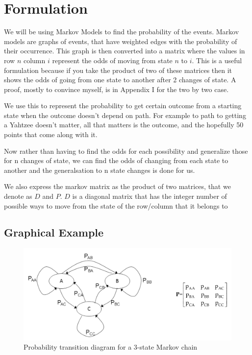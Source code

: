 
\section{Formulation}

	We will be using Markov Models to find the probability of the events.
Markov models are graphs of events, that have weighted edges with the probability of their occurrence.
This graph is then converted into a matrix where the values in row $n$ column $i$ represent the odds of moving from state $n$ to $i$.
This is a useful formulation because if you take the product of two of these matrices then it shows the odds of going from one state to another after 2 changes of state.
A proof, mostly to convince myself, is in Appendix I for the two by two case.

We use this to represent the probability to get certain outcome from a starting state when the outcome doesn't depend on path. For example to path to getting a Yahtzee doesn't matter, all that matters is the outcome, and the hopefully 50 points that come along with it.

Now rather than having to find the odds for each possibility and generalize those for n changes of state, we can find the odds of changing from each state to another and the generalsation to n state changes is done for us.

We also express the markov matrix as the product of two matrices, that we denote as $D$ and $P$. $D$ is a diagonal matrix that has the integer number of possible ways to move from the state of the row/column that it belongs to

\subsection{Graphical Example}

\begin{figure}
  \includegraphics[width=\linewidth]{image11.jpeg}
  \caption[3-State Markov]{Probability transition diagram for a 3-state Markov chain}
  \label{state}
\end{figure}



